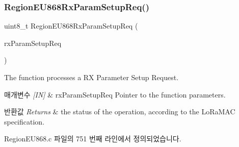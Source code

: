 \subsubsection{\texorpdfstring{Region\+E\+U868\+Rx\+Param\+Setup\+Req()}{RegionEU868RxParamSetupReq()}}
{\footnotesize\ttfamily uint8\+\_\+t Region\+E\+U868\+Rx\+Param\+Setup\+Req (\begin{DoxyParamCaption}\item[{\mbox{\hyperlink{group___r_e_g_i_o_n_ga7165f282c670c728c36d534df2285157}{Rx\+Param\+Setup\+Req\+Params\+\_\+t}} $\ast$}]{rx\+Param\+Setup\+Req }\end{DoxyParamCaption})}



The function processes a RX Parameter Setup Request. 


\begin{DoxyParams}{매개변수}
{\em \mbox{[}\+I\+N\mbox{]}} & rx\+Param\+Setup\+Req Pointer to the function parameters.\\
\hline
\end{DoxyParams}

\begin{DoxyRetVals}{반환값}
{\em Returns} & the status of the operation, according to the Lo\+Ra\+M\+AC specification. \\
\hline
\end{DoxyRetVals}


Region\+E\+U868.\+c 파일의 751 번째 라인에서 정의되었습니다.



